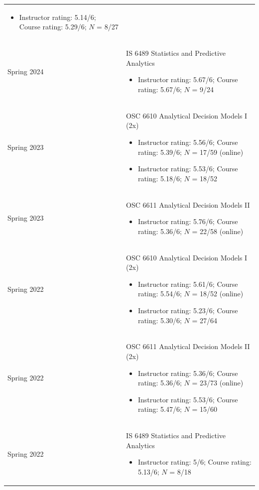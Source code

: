 \documentclass[11pt]{article}
\begin{document}
\begin{longtable}{p{2.5cm}p{14cm}}
\begin{itemize}[label={$\circ\;$}]
			\item Instructor rating: 5.14/6; Course rating: 5.29/6; $N$ = 8/27
		\end{itemize}\\
		Spring 2024 & IS 6489 Statistics and Predictive Analytics
						\begin{itemize}[label={$\circ\;$}]
			\item Instructor rating: 5.67/6; Course rating: 5.67/6; $N$ = 9/24
		\end{itemize}\\
		Spring 2023  & OSC 6610 Analytical Decision Models I (2x)
		\begin{itemize}[label={$\circ\;$}]
			\item Instructor rating: 5.56/6; Course rating: 5.39/6; $N$ = 17/59 (online)
			\item Instructor rating: 5.53/6; Course rating: 5.18/6; $N$ = 18/52
		\end{itemize}
		  \\
		Spring 2023 & OSC 6611  Analytical Decision Models II
		\begin{itemize}[label={$\circ\;$}]
			\item Instructor rating: 5.76/6; Course rating: 5.36/6; $N$ = 22/58 (online)
		\end{itemize}\\
		Spring 2022  & OSC 6610 Analytical Decision Models I (2x)
		\begin{itemize}[label={$\circ\;$}]
			\item  Instructor rating: 5.61/6; Course rating: 5.54/6; $N$ = 18/52 (online)
			\item Instructor rating: 5.23/6; Course rating: 5.30/6; $N$ = 27/64
		\end{itemize}\\
		Spring 2022 & OSC 6611  Analytical Decision Models II (2x)
		\begin{itemize}[label={$\circ\;$}]
					\item  Instructor rating: 5.36/6; Course rating: 5.36/6; $N$ = 23/73 (online)
			\item Instructor rating: 5.53/6; Course rating: 5.47/6; $N$ = 15/60
		\end{itemize}\\
		Spring 2022 & IS 6489 Statistics and Predictive Analytics
		\begin{itemize}[label={$\circ\;$}]
			\item Instructor rating: 5/6; Course rating: 5.13/6; $N$ = 8/18
		\end{itemize}\\

\end{longtable}
\end{document}
